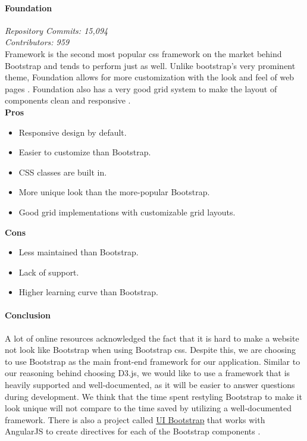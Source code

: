 \paragraph{Foundation}
\textit{Repository Commits: 15,094}\\ 
\textit{Contributors: 959}\\
Framework is the second most popular css framework on the market behind Bootstrap and tends to perform just as well. Unlike bootstrap's very prominent theme, Foundation allows for more customization with the look and feel of web pages \cite{Nick_Pettit}. Foundation also has a very good grid system to make the layout of components clean and responsive \cite{blankenship_2017}.\\ 
\textbf{Pros}
\begin{itemize}
    \item Responsive design by default.
    \item Easier to customize than Bootstrap.
    \item CSS classes are built in. \cite{team_2015}
    \item More unique look than the more-popular Bootstrap.
    \item Good grid implementations with customizable grid layouts.
\end{itemize}
\textbf{Cons}
\begin{itemize}
    \item Less maintained than Bootstrap.
    \item Lack of support.
    \item Higher learning curve than Bootstrap.
\end{itemize}
\paragraph{Conclusion}
A lot of online resources acknowledged the fact that it is hard to make a website not look like Bootstrap when using Bootstrap css. Despite this, we are choosing to use Bootstrap as the main front-end framework for our application. Similar to our reasoning behind choosing D3.js, we would like to use a framework that is heavily supported and well-documented, as it will be easier to answer questions during development. We think that the time spent restyling Bootstrap to make it look unique will not compare to the time saved by utilizing a well-documented framework. There is also a project called \href{https://angular-ui.github.io/bootstrap/}{UI Bootstrap} that works with AngularJS to create directives for each of the Bootstrap components \cite{sevilayha_2015}.
